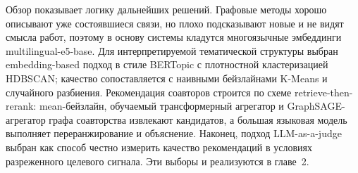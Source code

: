 Обзор показывает логику дальнейших решений. Графовые методы хорошо описывают уже состоявшиеся
связи, но плохо подсказывают новые и не видят смысла работ, поэтому в основу системы кладутся
многоязычные эмбеддинги multilingual-e5-base. Для интерпретируемой тематической структуры выбран
embedding-based подход в стиле BERTopic с плотностной кластеризацией HDBSCAN; качество
сопоставляется с наивными бейзлайнами K-Means и случайного разбиения. Рекомендация соавторов
строится по схеме retrieve-then-rerank: mean-бейзлайн, обучаемый трансформерный агрегатор и
GraphSAGE-агрегатор графа соавторства извлекают кандидатов, а большая языковая модель выполняет
переранжирование и объяснение. Наконец, подход
LLM-as-a-judge выбран как способ честно измерить качество рекомендаций в условиях разреженного
целевого сигнала. Эти выборы и реализуются в главе~2.
